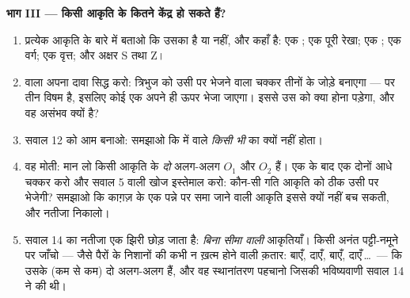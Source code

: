 \begin{problem}
\medskip
\noindent\textbf{भाग III --- किसी आकृति के कितने केंद्र हो सकते
हैं?}
\begin{enumerate}[resume]
  \item प्रत्येक आकृति के बारे में बताओ कि उसका  है
        या नहीं, और कहाँ है: एक ; एक पूरी रेखा; एक ; एक वर्ग; एक वृत्त; और अक्षर S तथा Z।
  \item {} वाला अपना दावा सिद्ध करो: त्रिभुज को उसी
        पर भेजने वाला  चक्कर तीनों  के जोड़े बनाएगा ---
        पर तीन विषम है, इसलिए कोई एक  अपने ही ऊपर भेजा
        जाएगा। इससे उस  को क्या होना पड़ेगा, और वह असंभव
        क्यों है?
  \item सवाल 12 को आम बनाओ: समझाओ कि  में 
        वाले \emph{किसी भी}  का  क्यों नहीं
        होता।
  \item वह मोती: मान लो किसी आकृति के \emph{दो} अलग-अलग  $O_1$ और $O_2$ हैं। एक के बाद एक दोनों आधे चक्कर
        करो और सवाल 5 वाली खोज इस्तेमाल करो: कौन-सी गति आकृति को
        ठीक उसी पर भेजेगी? समझाओ कि काग़ज़ के एक पन्ने पर समा
        जाने वाली आकृति इससे क्यों नहीं बच सकती, और नतीजा
        निकालो।
  \item सवाल 14 का नतीजा एक झिरी छोड़ जाता है: \emph{बिना सीमा
        वाली} आकृतियाँ। किसी अनंत पट्टी-नमूने पर जाँचो --- जैसे
        पैरों के निशानों की कभी न ख़त्म होने वाली क़तार: बाएँ,
        दाएँ, बाएँ, दाएँ\,\dots\ --- कि उसके (कम से कम) दो
        अलग-अलग  हैं, और वह स्थानांतरण पहचानो
        जिसकी भविष्यवाणी सवाल 14 ने की थी।
\end{enumerate}
\end{problem}
